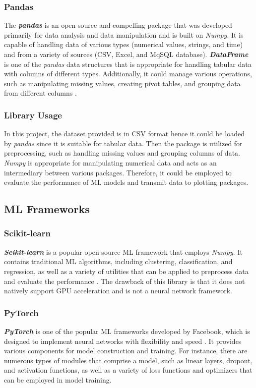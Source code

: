 \documentclass[12pt,twoside]{report}
\begin{document}
\subsubsection{Pandas}
The \textbf{\textit{pandas}} is an open-source and compelling package that was developed primarily for data analysis and data manipulation and is built on \textit{Numpy}. It is capable of handling data of various types (numerical values, strings, and time) and from a variety of sources (CSV, Excel, and MqSQL database). \textbf{\textit{DataFrame}} is one of the \textit{pandas} data structures that is appropriate for handling tabular data with columns of different types. Additionally, it could manage various operations, such as manipulating missing values, creating pivot tables, and grouping data from different columns \citep{RN4}. 

\subsubsection{Library Usage}
In this project, the dataset provided is in CSV format hence it could be loaded by \textit{pandas} since it is suitable for tabular data. Then the package is utilized for preprocessing, such as handling missing values and grouping columns of data. 
\\

\textit{Numpy} is appropriate for manipulating numerical data and acts as an intermediary between various packages. Therefore, it could be employed to evaluate the performance of ML models and transmit data to plotting packages. 


\subsection{ML Frameworks}
\subsubsection{Scikit-learn}
\textit{\textbf{Scikit-learn}} is a popular open-source ML framework that employs \textit{Numpy}. It contains traditional ML algorithms, including clustering, classification, and regression, as well as a variety of utilities that can be applied to preprocess data and evaluate the performance \citep{RN7}. The drawback of this library is that it does not natively support GPU acceleration and is not a neural network framework. 

\subsubsection{PyTorch}
\textbf{\textit{PyTorch}} is one of the popular ML frameworks developed by Facebook, which is designed to implement neural networks with flexibility and speed \citep{RN5}. It provides various components for model construction and training. For instance, there are numerous types of modules that comprise a model, such as linear layers, dropout, and activation functions, as well as a variety of loss functions and optimizers that can be employed in model training. 
\\
\end{document}
